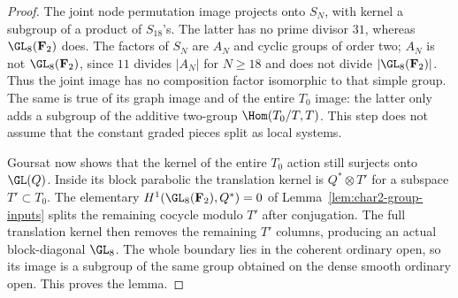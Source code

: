 \begin{proof}
The joint node permutation image projects onto $S_N$, with kernel a
subgroup of a product of $S_{18}$'s. The latter has no prime divisor
$31$, whereas $\GL_8(\mathbf F_2)$ does. The factors of $S_N$ are
$A_N$ and cyclic groups of order two; $A_N$ is not $\GL_8(\mathbf F_2)$,
since $11$ divides $|A_N|$ for $N\ge18$ and does not divide
$|\GL_8(\mathbf F_2)|$. Thus the joint image has no composition factor
isomorphic to that simple group. The same is true of its graph image
and of the entire $T_0$ image: the latter only adds a subgroup of the
additive two-group $\Hom(T_0/T,T)$. This step does not assume that the
constant graded pieces split as local systems.

Goursat now shows that the kernel of the entire $T_0$ action still
surjects onto $\GL(Q)$. Inside its block parabolic the translation
kernel is $Q^*\otimes T'$ for a subspace $T'\subset T_0$.
The elementary $H^1(\GL_8(\mathbf F_2),Q^*)=0$ of
Lemma~\ref{lem:char2-group-inputs} splits the remaining cocycle modulo
$T'$ after conjugation. The full translation kernel then removes the
remaining $T'$ columns, producing an actual block-diagonal $\GL_8$.
The whole boundary lies in the coherent ordinary open, so its image is
a subgroup of the same group obtained on the dense smooth ordinary
open. This proves the lemma.
\end{proof}

